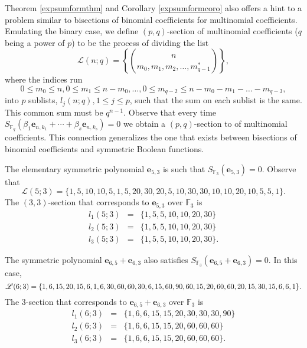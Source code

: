 Theorem \ref{expsumformthm} and Corollary \ref{expsumformcoro} also offers a hint to a problem similar to bisections of binomial coefficients for multinomial coefficients. Emulating the binary case, we define 
$(p,q)$-section of multinomial coefficients ($q$ being a power of $p$) to be the process of dividing the list
\begin{equation}
 \mathcal{L}(n;q)=\left\{{n\choose m_0,m_1,m_2,\ldots, m_{q-1}^*}\right\},
\end{equation}
where the indices run
$$0\leq m_0 \leq n, 0\leq m_1\leq n-m_0,\ldots,0\leq m_{q-2}\leq n-m_0-m_1-\ldots-m_{q-3},$$
into $p$ sublists, $l_j(n;q), 1\leq j \leq p$, such that the sum on each sublist is the same. This common sum must be $q^{n-1}$. Observe that every time 
$S_{\mathbb{F}_q}(\beta_1\boldsymbol{e}_{n,k_1}+\cdots+\beta_s\boldsymbol{e}_{n,k_s})=0$ we obtain
a $(p,q)$-section to of multinomial coefficients.  This connection generalizes the one that exists between bisections of binomial coefficients and symmetric Boolean functions.
\begin{example}
The elementary symmetric polynomial $\boldsymbol{e}_{5,3}$ is such that $S_{\mathbb{F}_3}(\boldsymbol{e}_{5,3})=0$.  
Observe that
\begin{equation}
 \mathcal{L}(5;3) =\{1, 5, 10, 10, 5, 1, 5, 20, 30, 20, 5, 10, 30, 30, 10, 10, 20, 10, 5, 5, 1\}.
\end{equation}
The $(3,3)$-section that corresponds to
$\boldsymbol{e}_{5,3}$ over $\mathbb{F}_3$ is
\begin{eqnarray}
 l_1(5;3) &=& \{1, 5, 5, 10, 10, 20, 30\}\\\nonumber
 l_2(5;3) &=& \{1, 5, 5, 10, 10, 20, 30\}\\\nonumber
 l_3(5;3) &=& \{1, 5, 5, 10, 10, 20, 30\}.
\end{eqnarray} 
\end{example}

\begin{example}
The symmetric polynomial $\boldsymbol{e}_{6,5}+\boldsymbol{e}_{6,3}$ also satisfies $S_{\mathbb{F}_3}(\boldsymbol{e}_{6,5}+\boldsymbol{e}_{6,3})=0$.  
In this case,
\begin{equation}
 \small\mathcal{L}(6;3) =\{1, 6, 15, 20, 15, 6, 1, 6, 30, 60, 60, 30, 6, 15, 60, 90, 60, 15, 20, 60, 60, 20, 15, 30, 15, 6, 6, 1\}.
\end{equation}
The 3-section that corresponds to $\boldsymbol{e}_{6,5}+\boldsymbol{e}_{6,3}$ over $\mathbb{F}_3$ is
\begin{eqnarray}
\label{3sec}
 l_1(6;3) &=& \{1, 6, 6, 15, 15, 20, 30, 30, 30, 90\}\\\nonumber
 l_2(6;3) &=& \{1, 6, 6, 15, 15, 20, 60, 60, 60\}\\\nonumber
 l_3(6;3) &=& \{1, 6, 6, 15, 15, 20, 60, 60, 60\}.
\end{eqnarray}  
\end{example}

